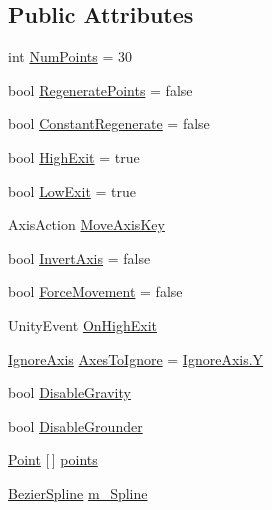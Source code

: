 \subsection*{Public Attributes}
\begin{DoxyCompactItemize}
\item 
int \mbox{\hyperlink{class_spline_movement_adbbea5ed021fc7b6f7c400400a7dcd3a}{Num\+Points}} = 30
\item 
bool \mbox{\hyperlink{class_spline_movement_a6f38fd94d067872d8f11b50965ac776f}{Regenerate\+Points}} = false
\item 
bool \mbox{\hyperlink{class_spline_movement_a2f1281a919203432cca759b814642c08}{Constant\+Regenerate}} = false
\item 
bool \mbox{\hyperlink{class_spline_movement_a21c86cdee895ba1a71af2eeaf28f51eb}{High\+Exit}} = true
\item 
bool \mbox{\hyperlink{class_spline_movement_ae7ef31a81a9bef0a404aa5aff3ec5e2b}{Low\+Exit}} = true
\item 
Axis\+Action \mbox{\hyperlink{class_spline_movement_a9915058d410d11abf2ff0a53d6175e5f}{Move\+Axis\+Key}}
\item 
bool \mbox{\hyperlink{class_spline_movement_a2417f1ad0eeec517e5896c16175af012}{Invert\+Axis}} = false
\item 
bool \mbox{\hyperlink{class_spline_movement_adace2321a290e27160f326d7257f7db7}{Force\+Movement}} = false
\item 
Unity\+Event \mbox{\hyperlink{class_spline_movement_ae21d40c99f8da6645cf1041e79dbe0c9}{On\+High\+Exit}}
\item 
\mbox{\hyperlink{_ignore_axis_8cs_aa61b0141055d583a4f5b013297a1d48f}{Ignore\+Axis}} \mbox{\hyperlink{class_spline_movement_a5731a01361661e4c1cc4de230e3d80be}{Axes\+To\+Ignore}} = \mbox{\hyperlink{_ignore_axis_8cs_aa61b0141055d583a4f5b013297a1d48fa57cec4137b614c87cb4e24a3d003a3e0}{Ignore\+Axis.\+Y}}
\item 
bool \mbox{\hyperlink{class_spline_movement_a8f829fcdc1fdc601d94e6eb6a5f186a0}{Disable\+Gravity}}
\item 
bool \mbox{\hyperlink{class_spline_movement_a639e4325e5208e76cfa10b07786d63b3}{Disable\+Grounder}}
\item 
\mbox{\hyperlink{class_spline_movement_1_1_point}{Point}} \mbox{[}$\,$\mbox{]} \mbox{\hyperlink{class_spline_movement_a3ab10a8f9594bbaf278ac2c7c8e6858d}{points}}
\item 
\mbox{\hyperlink{class_bezier_spline}{Bezier\+Spline}} \mbox{\hyperlink{class_spline_movement_afd3796f0a70d33023cb46d913b06a51e}{m\+\_\+\+Spline}}
\end{DoxyCompactItemize}


